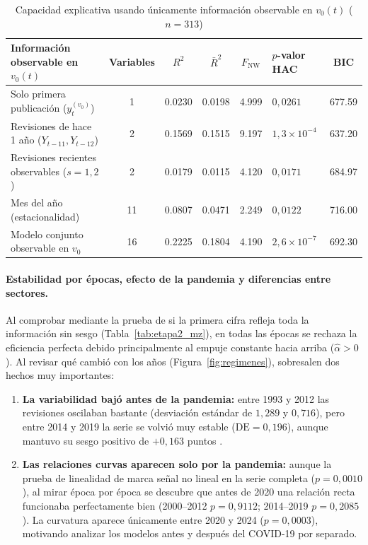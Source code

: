 \begin{table}[htbp]
	\centering
	\caption{Capacidad explicativa usando únicamente información observable en \(v_0(t)\) (\(n=313\))}
	\label{tab:etapa2_rt}
	\footnotesize
	\renewcommand{\arraystretch}{1.15}
	\begin{tabular}{@{}l c S[table-format=1.4] S[table-format=1.4] S[table-format=1.3] l S[table-format=3.2]@{}}
		\toprule
		Información observable en \(v_0(t)\) & Variables & {\(R^2\)} & {\(\bar{R}^2\)} & {\(F_{\text{NW}}\)} & {\(p\)-valor HAC} & {BIC}\\
		\midrule
		Solo primera publicación (\(y_t^{(v_0)}\)) & 1 & 0.0230 & 0.0198 & 4.999 & \(0{,}0261\) & 677.59\\
		Revisiones de hace 1 año (\(Y_{t-11}, Y_{t-12}\)) & 2 & 0.1569 & 0.1515 & 9.197 & \(1{,}3\times 10^{-4}\) & 637.20\\
		Revisiones recientes observables (\(s=1,2\)) & 2 & 0.0179 & 0.0115 & 4.120 & \(0{,}0171\) & 684.97\\
		Mes del año (estacionalidad) & 11 & 0.0807 & 0.0471 & 2.249 & \(0{,}0122\) & 716.00\\
		Modelo conjunto observable en \(v_0\) & 16 & 0.2225 & 0.1804 & 4.190 & \(2{,}6\times 10^{-7}\) & 692.30\\
		\bottomrule
	\end{tabular}
\end{table}

\paragraph{Estabilidad por épocas, efecto de la pandemia y diferencias entre sectores.}
Al comprobar mediante la prueba de \textcite{mincer1969} si la primera cifra refleja toda la información sin sesgo (Tabla~\ref{tab:etapa2_mz}), en todas las épocas se rechaza la eficiencia perfecta debido principalmente al empuje constante hacia arriba (\(\hat{\alpha} > 0\)). Al revisar qué cambió con los años (Figura~\ref{fig:regimenes}), sobresalen dos hechos muy importantes:
\begin{enumerate}
	\item \textbf{La variabilidad bajó antes de la pandemia:} entre 1993 y 2012 las revisiones oscilaban bastante (desviación estándar de \(1{,}289\) y \(0{,}716\)), pero entre 2014 y 2019 la serie se volvió muy estable (\(\text{DE}=0{,}196\)), aunque mantuvo su sesgo positivo de \(+0{,}163\) puntos \parencite{engle1982}.
	\item \textbf{Las relaciones curvas aparecen solo por la pandemia:} aunque la prueba de linealidad de \textcite{ramsey1969} marca señal no lineal en la serie completa (\(p=0{,}0010\)), al mirar época por época se descubre que antes de 2020 una relación recta funcionaba perfectamente bien (2000--2012 \(p=0{,}9112\); 2014--2019 \(p=0{,}2085\)). La curvatura aparece únicamente entre 2020 y 2024 (\(p=0{,}0003\)), motivando analizar los modelos antes y después del COVID-19 por separado.
\end{enumerate}

